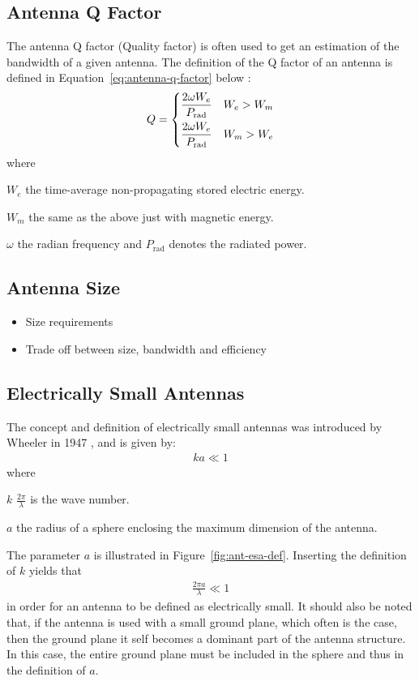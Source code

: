 \subsection{Antenna Q Factor}
The antenna Q factor (Quality factor) is often used to get an estimation of the bandwidth of a given antenna. The definition of the Q factor of an antenna is defined in Equation~\ref{eq:antenna-q-factor} below \cite{fundamentalMcLean}: 
\begin{align}
  \label{eq:antenna-q-factor}
      Q =
    \begin{dcases}
       \frac{2 \omega W_e}{P_{\text{rad}}} & W_e > W_m  \\
       \frac{2 \omega W_e}{P_{\text{rad}}} & W_m > W_e 
    \end{dcases}
\end{align}
where 
\begin{where}
\item[$W_e$] the time-average non-propagating stored electric energy.
\item[$W_m$] the same as the above just with magnetic energy.
\item[$\omega$] the radian frequency and $P_{\text{rad}}$ denotes the radiated power.
\end{where}

\subsection{Antenna Size}
\begin{itemize}
\item Size requirements
\item Trade off between size, bandwidth and efficiency
\end{itemize}

\subsection{Electrically Small Antennas}
The concept and definition of electrically small antennas was introduced by Wheeler in 1947 \cite{wheeler1947}, and is given by:
\begin{align}
\label{eq:esa-def}
  ka \ll 1
\end{align}
where 
\begin{where}
\item[$k$] $\frac{2\pi}{\lambda}$ is the wave number. 
\item[$a$] the radius of a sphere enclosing the maximum dimension of the antenna. 
\end{where}
The parameter $a$ is illustrated in Figure~\ref{fig:ant-esa-def}. Inserting the definition of $k$ yields that
\begin{align}
  \frac{2\pi a}{\lambda} \ll 1
\end{align}
in order for an antenna to be defined as electrically small. It should also be noted that, if the antenna is used with a small ground plane, which often is the case, then the ground plane it self becomes a dominant part of the antenna structure. In this case, the entire ground plane must be included in the sphere and thus in the definition of $a$.

